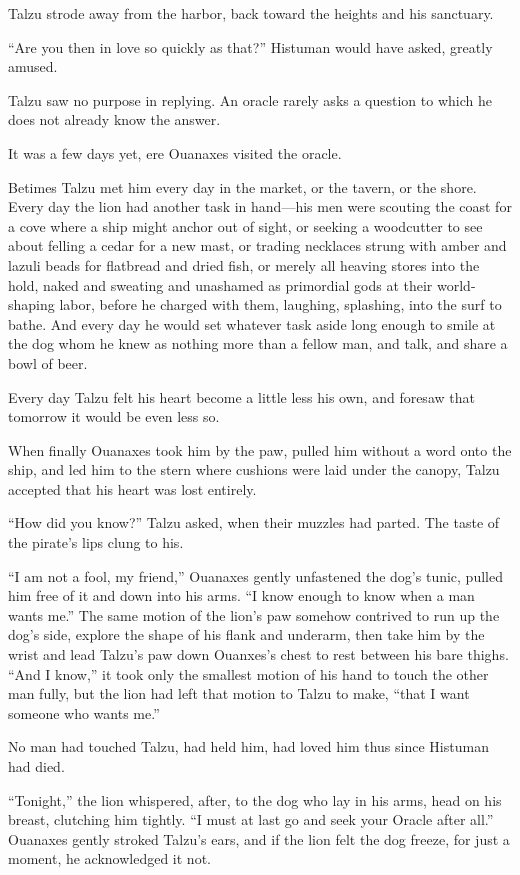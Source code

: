 Talzu strode away from the harbor, back toward the heights and his sanctuary.

``Are you then in love so quickly as that?'' Histuman would have asked, greatly amused.

Talzu saw no purpose in replying. An oracle rarely asks a question to which he does not already know the answer.

It was a few days yet, ere Ouanaxes visited the oracle.

Betimes Talzu met him every day in the market, or the tavern, or the shore. Every day the lion had another task in hand---his men were scouting the coast for a cove where a ship might anchor out of sight, or seeking a woodcutter to see about felling a cedar for a new mast, or trading necklaces strung with amber and lazuli beads for flatbread and dried fish, or merely all heaving stores into the hold, naked and sweating and unashamed as primordial gods at their world-shaping labor, before he charged with them, laughing, splashing, into the surf to bathe. And every day he would set whatever task aside long enough to smile at the dog whom he knew as nothing more than a fellow man, and talk, and share a bowl of beer.

Every day Talzu felt his heart become a little less his own, and foresaw that tomorrow it would be even less so.

When finally Ouanaxes took him by the paw, pulled him without a word onto the ship, and led him to the stern where cushions were laid under the canopy, Talzu accepted that his heart was lost entirely.

``How did you know?'' Talzu asked, when their muzzles had parted. The taste of the pirate's lips clung to his.

``I am not a fool, my friend,'' Ouanaxes gently unfastened the dog's tunic, pulled him free of it and down into his arms. ``I know enough to know when a man wants me.'' The same motion of the lion's paw somehow contrived to run up the dog's side, explore the shape of his flank and underarm, then take him by the wrist and lead Talzu's paw down Ouanxes's chest to rest between his bare thighs. ``And I know,'' it took only the smallest motion of his hand to touch the other man fully, but the lion had left that motion to Talzu to make, ``that I want someone who wants me.''

No man had touched Talzu, had held him, had loved him thus since Histuman had died.

``Tonight,'' the lion whispered, after, to the dog who lay in his arms, head on his breast, clutching him tightly. ``I must at last go and seek your Oracle after all.'' Ouanaxes gently stroked Talzu's ears, and if the lion felt the dog freeze, for just a moment, he acknowledged it not.

